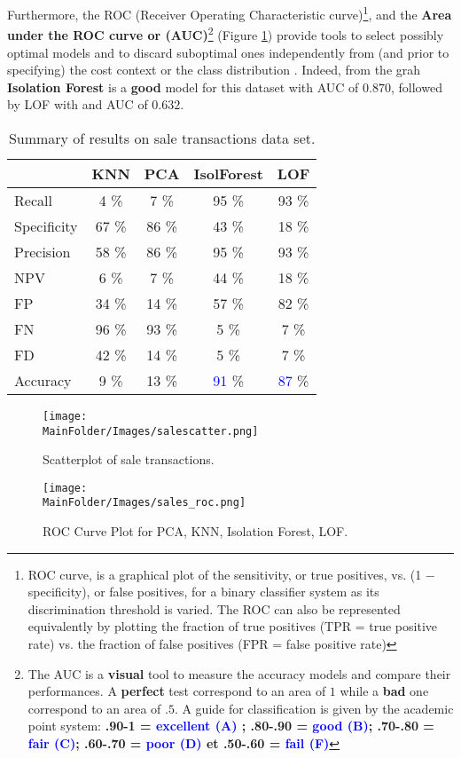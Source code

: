 Furthermore, the ROC (Receiver Operating Characteristic curve)\footnote{ROC curve, is a graphical plot of the sensitivity, or true positives, vs. (1 − specificity), or false positives, for a binary classifier system as its discrimination threshold is varied. The ROC can also be represented equivalently by plotting the fraction of true positives (TPR = true positive rate) vs. the fraction of false positives (FPR = false positive rate)}, and the \textbf{Area under the ROC curve or (AUC)}\footnote{ The AUC is a \textbf{visual} tool to measure the accuracy models and compare their performances. A \textbf{perfect} test correspond to an area of $1$ while a \textbf{bad} one correspond to an area of $.5$. A guide for classification is given by the academic point system: \textbf{
.90-1 = \textcolor{blue}{excellent (A)} ; .80-.90 = \textcolor{blue}{good (B)}; .70-.80 = \textcolor{blue}{fair (C)}; .60-.70 = \textcolor{blue}{poor (D)} et .50-.60 = \textcolor{blue}{fail (F)}}} (Figure \ref{fig_sal14})  provide tools to select possibly optimal models and to discard suboptimal ones independently from (and prior to specifying) the cost context or the class distribution \cite{ROC}. Indeed, from the grah \textbf{Isolation Forest} is a \textbf{good} model for this dataset with  AUC of $0.870$, followed by LOF with and AUC of $0.632$.
\begin{table}[H]
\centering
 \begin{tabular}{||l c c c c||} 
 \hline
 &  KNN & PCA & IsolForest & LOF\\ [0.5ex] 
 \hline\hline
Recall & 4 \% & 7 \%  & 95 \% & 93  \% \\ 
Specificity & 67 \% & 86 \%  & 43 \% & 18 \% \\
Precision & 58 \% & 86 \%  & 95 \% & 93 \% \\
NPV & 6 \% & 7 \%  & 44 \% & 18 \% \\
FP & 34 \% & 14 \%  & 57 \% & 82 \% \\
FN & 96 \% & 93 \%  & 5 \% & 7 \% \\
FD & 42 \% & 14 \%  & 5 \% & 7 \% \\
Accuracy & 9 \% & 13 \%  & \textcolor{blue}{91} \% & \textcolor{blue}{87} \% \\
[1ex] 
 \hline
 \end{tabular}
 \caption{Summary of results on sale transactions data set.}
 \label{fig_sale3}
\end{table}
\begin{figure}[H]
    \centering
    \texttt{[image: \\MainFolder/Images/salescatter.png]}
    \label{fig_sal11}
    \caption{Scatterplot of sale transactions.}%
     \texttt{[image: \\MainFolder/Images/sales\_roc.png]}
     \caption{ROC Curve Plot for PCA, KNN, Isolation Forest, LOF.}%
     \label{fig_sal14}
\end{figure}

